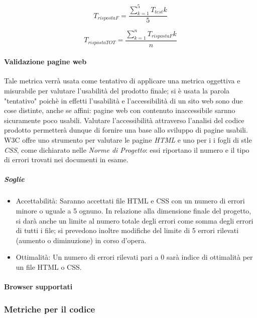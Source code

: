 	\begin{displaymath}
		\mbox{$T_{rispostaF}$} =\frac{\sum_{k=1}^5 T_{test}k}{5}
	\end{displaymath}
	
	\begin{displaymath}
		\mbox{$T_{rispostaTOT}$} =\frac{\sum_{k=1}^n T_{rispostaF}k}{n}
	\end{displaymath}
	 
\paragraph{Validazione pagine web}
Tale metrica verrà usata come tentativo di applicare una metrica oggettiva e misurabile per valutare l'usabilità del prodotto finale; si è usata la parola "tentativo" poichè in effetti l'usabilità e l'accessibilità di un sito web sono due cose distinte, anche se affini: pagine web con contenuto inaccessibile sarnno sicuramente poco usabili. Valutare l'accessibilità attraverso l'analisi del codice prodotto permetterà dunque di fornire una base allo sviluppo di pagine usabili.
W3C offre uno strumento per valutare le pagine \emph{HTML} e uno per i i fogli di stle \emph{CSS}, come dichiarato nelle \emph{Norme di Progetto}: essi riportano il numero e il tipo di errori trovati nei documenti in esame.

\subparagraph{Soglie}
	\begin{itemize}
	\item Accettabilità: Saranno accettati file HTML e CSS con un numero di errori minore o uguale a 5 ognuno. In relazione alla dimensione finale del progetto, si darà anche un limite al numero totale degli errori come somma degli errori di tutti i file; si prevedono inoltre modifiche del limite di 5 errori rilevati (aumento o diminuzione) in corso d'opera.
	\item Ottimalità: Un numero di errori rilevati pari a 0 sarà indice di ottimalità per un file HTML o CSS.
	\end{itemize}
	
\paragraph{Browser supportati}




\subsubsection{Metriche per il codice}
